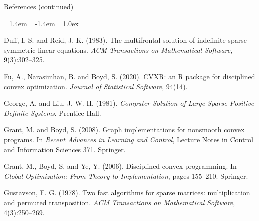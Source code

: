 \documentclass[10pt,mathserif,aspectratio=169]{beamer}
\begin{document}
\begin{frame}{References (continued)}
\vspace{-0.5ex}
{\footnotesize
\begin{list}{}{\leftmargin=1.4em \itemindent=-1.4em \itemsep=1.0ex
               \parsep=0pt \topsep=0pt}
\item Duff, I. S. and Reid, J. K. (1983). The multifrontal solution of indefinite sparse
      symmetric linear equations. \emph{ACM Transactions on Mathematical Software},
      9(3):302--325.
\item Fu, A., Narasimhan, B. and Boyd, S. (2020). CVXR: an R package for disciplined convex
      optimization. \emph{Journal of Statistical Software}, 94(14).
\item George, A. and Liu, J. W. H. (1981). \emph{Computer Solution of Large Sparse Positive
      Definite Systems}. Prentice-Hall.
\item Grant, M. and Boyd, S. (2008). Graph implementations for nonsmooth convex programs. In
      \emph{Recent Advances in Learning and Control}, Lecture Notes in Control and Information
      Sciences 371. Springer.
\item Grant, M., Boyd, S. and Ye, Y. (2006). Disciplined convex programming. In
      \emph{Global Optimization: From Theory to Implementation}, pages 155--210. Springer.
\item Gustavson, F. G. (1978). Two fast algorithms for sparse matrices: multiplication and
      permuted transposition. \emph{ACM Transactions on Mathematical Software},
      4(3):250--269.
\end{list}}
\end{frame}
\end{document}
